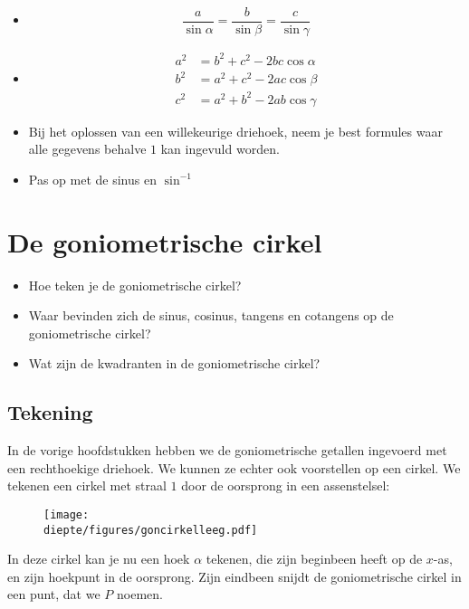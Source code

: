 \documentclass[a4paper,12pt]{article}
\newcommand{\diepte}{./}
\begin{document}
\begin{framed}
\begin{itemize}
	\item {}
	\[\frac{a}{\sin \alpha}=\frac{b}{\sin \beta}=\frac{c}{\sin \gamma}\]
	\item {}
	\begin{align*}
a^2&= b^2+c^2-2bc\cos \alpha\\
b^2&=a^2 + c^2 - 2ac\cos \beta\\
c^2&= a^2 + b^2 -2ab \cos \gamma
\end{align*}
\item Bij het oplossen van een willekeurige driehoek, neem je best formules waar alle gegevens behalve $1$ kan ingevuld worden.
\item Pas op met de sinus en $\sin^{-1}$
\end{itemize}
\end{framed}

\newpage

\section{De goniometrische cirkel}

\begin{itemize}
	\item Hoe teken je de goniometrische cirkel?
	\item Waar bevinden zich de sinus, cosinus, tangens en cotangens op de goniometrische cirkel?
	\item Wat zijn de kwadranten in de goniometrische cirkel?
\end{itemize}

\subsection{Tekening}

In de vorige hoofdstukken hebben we de goniometrische getallen ingevoerd met een rechthoekige driehoek. We kunnen ze echter ook voorstellen op een cirkel. We tekenen een cirkel met straal $1$ door de oorsprong in een assenstelsel:
\begin{figure}[h]
\begin{center}
\texttt{[image: \\diepte/figures/goncirkelleeg.pdf]}
\end{center}
\end{figure}

In deze cirkel kan je nu een hoek $\alpha$ tekenen, die zijn beginbeen heeft op de $x$-as, en zijn hoekpunt in de oorsprong. Zijn eindbeen snijdt de goniometrische cirkel in een punt, dat we $P$ noemen.
\end{document}
